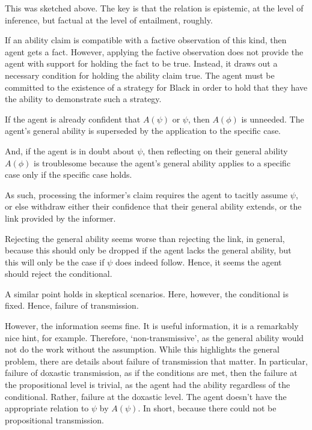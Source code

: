\documentclass[10pt]{article}
\begin{document}
\begin{note}
  This was sketched above.
  The key is that the relation is epistemic, at the level of inference, but factual at the level of entailment, roughly.
\end{note}

If an ability claim is compatible with a factive observation of this kind, then agent gets a fact.
However, applying the factive observation does not provide the agent with support for holding the fact to be true.
Instead, it draws out a necessary condition for holding the ability claim true.
The agent must be committed to the existence of a strategy for Black in order to hold that they have the ability to demonstrate such a strategy.


\begin{note}
  If the agent is already confident that \(A(\psi)\) or \(\psi\), then \(A(\phi)\) is unneeded.
  The agent's general ability is superseded by the application to the specific case.

  And, if the agent is in doubt about \(\psi\), then reflecting on their general ability \(A(\phi)\) is troublesome because the agent's general ability applies to a specific case only if the specific case holds.

  As such, processing the informer's claim requires the agent to tacitly assume \(\psi\), or else withdraw either their confidence that their general ability extends, or the link provided by the informer.

  Rejecting the general ability seems worse than rejecting the link, in general, because this should only be dropped if the agent lacks the general ability, but this will only be the case if \(\psi\) does indeed follow.
  Hence, it seems the agent should reject the conditional.

  A similar point holds in skeptical scenarios.
  Here, however, the conditional is fixed.
  Hence, failure of transmission.

  However, the information seems fine.
  It is useful information, it is a remarkably nice hint, for example.
  Therefore, `non-transmissive', as the general ability would not do the work without the assumption.
  While this highlights the general problem, there are details about failure of transmission that matter.
  In particular, failure of doxastic transmission, as if the conditions are met, then the failure at the propositional level is trivial, as the agent had the ability regardless of the conditional.
  Rather, failure at the doxastic level.
  The agent doesn't have the appropriate relation to \(\psi\) by \(A(\psi)\).
  In short, because there could not be propositional transmission.
\end{note}
\end{document}
